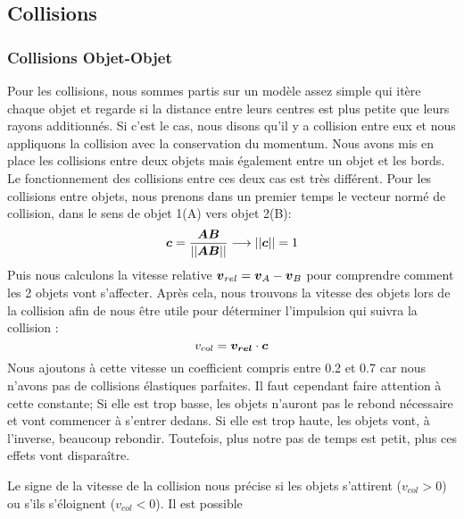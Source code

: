     \subsection{Collisions}
        \subsubsection{Collisions Objet-Objet}
            Pour les collisions, nous sommes partis sur un modèle assez simple qui itère chaque objet et regarde si la distance entre leurs centres est plus petite que leurs rayons additionnés. Si c'est le cas, nous disons qu'il y a collision entre eux et nous appliquons la collision avec la conservation du momentum. 
            Nous avons mis en place les collisions entre deux objets mais également entre un objet et les bords. Le fonctionnement des collisions entre ces deux cas est très différent. Pour les collisions entre objets, nous prenons dans un premier temps le vecteur normé de collision, dans le sens de objet 1(A) vers objet 2(B):
            \begin{equation}
                \vb*{c} = \frac{\vb*{AB}}{||\vb*{AB}||} \longrightarrow ||\vb*{c}|| = 1
            \end{equation}
            Puis nous calculons la vitesse relative $\vb*{v}_{rel} = \vb*{v}_A - \vb*{v}_B$ pour comprendre comment les 2 objets vont s'affecter. Après cela, nous trouvons la vitesse des objets lors de la collision afin de nous être utile pour déterminer l'impulsion qui suivra la collision :
            \begin{equation}
                v_{col}=\vb*{v_{rel}}\cdot\vb*{c}
            \end{equation}
            Nous ajoutons à cette vitesse un coefficient compris entre 0.2 et 0.7 car nous n'avons pas de collisions élastiques parfaites. Il faut cependant faire attention à cette constante; Si elle est trop basse, les objets n'auront pas le rebond nécessaire et vont commencer à s'entrer dedans. Si elle est trop haute, les objets vont, à l'inverse, beaucoup rebondir. Toutefois, plus notre pas de temps est petit, plus ces effets vont disparaître.
            
            Le signe de la vitesse de la collision nous précise si les objets s'attirent ($v_{col} > 0$) ou s'ils s'éloignent ($v_{col} < 0$). Il est possible
            
